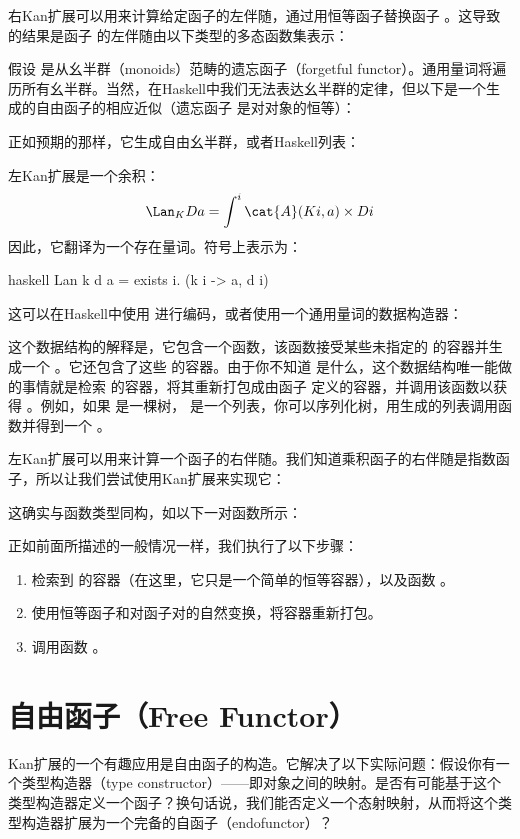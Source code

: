 右Kan扩展可以用来计算给定函子的左伴随，通过用恒等函子替换函子 。这导致的结果是函子  的左伴随由以下类型的多态函数集表示：

假设  是从幺半群（monoids）范畴的遗忘函子（forgetful functor）。通用量词将遍历所有幺半群。当然，在Haskell中我们无法表达幺半群的定律，但以下是一个生成的自由函子的相应近似（遗忘函子  是对对象的恒等）：

正如预期的那样，它生成自由幺半群，或者Haskell列表：

左Kan扩展是一个余积：
\[\Lan_{K}D a = \int^i \cat{A}(K i, a)\times{}D i\]
因此，它翻译为一个存在量词。符号上表示为：

\begin{snip}{haskell}
  Lan k d a = exists i. (k i -> a, d i)
\end{snip}
这可以在Haskell中使用  进行编码，或者使用一个通用量词的数据构造器：

这个数据结构的解释是，它包含一个函数，该函数接受某些未指定的  的容器并生成一个 。它还包含了这些  的容器。由于你不知道  是什么，这个数据结构唯一能做的事情就是检索  的容器，将其重新打包成由函子  定义的容器，并调用该函数以获得 。例如，如果  是一棵树， 是一个列表，你可以序列化树，用生成的列表调用函数并得到一个 。

左Kan扩展可以用来计算一个函子的右伴随。我们知道乘积函子的右伴随是指数函子，所以让我们尝试使用Kan扩展来实现它：

这确实与函数类型同构，如以下一对函数所示：

正如前面所描述的一般情况一样，我们执行了以下步骤：

\begin{enumerate}
  \tightlist
  \item
  检索到  的容器（在这里，它只是一个简单的恒等容器），以及函数 。
  \item
  使用恒等函子和对函子对的自然变换，将容器重新打包。
  \item
  调用函数 。
\end{enumerate}

\section{自由函子（Free Functor）}

Kan扩展的一个有趣应用是自由函子的构造。它解决了以下实际问题：假设你有一个类型构造器（type constructor）——即对象之间的映射。是否有可能基于这个类型构造器定义一个函子？换句话说，我们能否定义一个态射映射，从而将这个类型构造器扩展为一个完备的自函子（endofunctor）？

